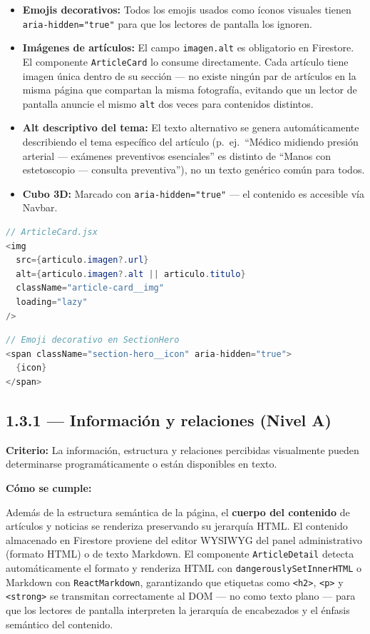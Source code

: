 \documentclass[12pt, a4paper]{article}
\begin{document}
\begin{itemize}
  \item \textbf{Emojis decorativos:} Todos los emojis usados como íconos visuales tienen \texttt{aria-hidden="true"} para que los lectores de pantalla los ignoren.
  \item \textbf{Imágenes de artículos:} El campo \texttt{imagen.alt} es obligatorio en Firestore. El componente \texttt{ArticleCard} lo consume directamente. Cada artículo tiene imagen única dentro de su sección --- no existe ningún par de artículos en la misma página que compartan la misma fotografía, evitando que un lector de pantalla anuncie el mismo \texttt{alt} dos veces para contenidos distintos.
  \item \textbf{Alt descriptivo del tema:} El texto alternativo se genera automáticamente describiendo el tema específico del artículo (p.~ej.\ ``Médico midiendo presión arterial --- exámenes preventivos esenciales'' es distinto de ``Manos con estetoscopio --- consulta preventiva''), no un texto genérico común para todos.
  \item \textbf{Cubo 3D:} Marcado con \texttt{aria-hidden="true"} --- el contenido es accesible vía Navbar.
\end{itemize}

\begin{evidbox}
\begin{lstlisting}[language=Java]
// ArticleCard.jsx
<img
  src={articulo.imagen?.url}
  alt={articulo.imagen?.alt || articulo.titulo}
  className="article-card__img"
  loading="lazy"
/>
\end{lstlisting}
\begin{lstlisting}[language=Java]
// Emoji decorativo en SectionHero
<span className="section-hero__icon" aria-hidden="true">
  {icon}
</span>
\end{lstlisting}
\end{evidbox}

\subsection{1.3.1 --- Información y relaciones (Nivel A)}

\textbf{Criterio:} La información, estructura y relaciones percibidas visualmente pueden determinarse programáticamente o están disponibles en texto.

\textbf{Cómo se cumple:}

Además de la estructura semántica de la página, el \textbf{cuerpo del contenido} de artículos y noticias se renderiza preservando su jerarquía HTML. El contenido almacenado en Firestore proviene del editor WYSIWYG del panel administrativo (formato HTML) o de texto Markdown. El componente \texttt{ArticleDetail} detecta automáticamente el formato y renderiza HTML con \texttt{dangerouslySetInnerHTML} o Markdown con \texttt{ReactMarkdown}, garantizando que etiquetas como \texttt{<h2>}, \texttt{<p>} y \texttt{<strong>} se transmitan correctamente al DOM --- no como texto plano --- para que los lectores de pantalla interpreten la jerarquía de encabezados y el énfasis semántico del contenido.
\end{document}
